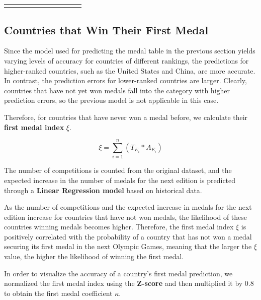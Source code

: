 \documentclass[12pt]{article}  %
\begin{document}
\begin{longtable}{l|c|c|c|c|c|c|c|c|c|c}
	\multicolumn{1}{l}{} & \multicolumn{1}{c}{}                                                   & \multicolumn{1}{c}{}                                                   & \multicolumn{1}{c}{}                                                   & \multicolumn{1}{c}{}                                                   & \multicolumn{1}{c}{}                                                   & \multicolumn{1}{c}{}                                                   & \multicolumn{1}{c}{}      & \multicolumn{1}{c}{}        & \multicolumn{1}{c}{}        &                           
\end{longtable}
\subsection{Countries that Win Their First Medal}
Since the model used for predicting the medal table in the previous section yields varying levels of accuracy for countries of different rankings, the predictions for higher-ranked countries, such as the United States and China, are more accurate. In contrast, the prediction errors for lower-ranked countries are larger. Clearly, countries that have not yet won medals fall into the category with higher prediction errors, so the previous model is not applicable in this case.

Therefore, for countries that have never won a medal before, we calculate their \textbf{first medal index} $\xi$.

\begin{equation}
	\xi = \sum_{i=1}^{n} \left( T_{E_i} \ast A_{E_i} \right)
\end{equation}





The number of competitions is counted from the original dataset, and the expected increase in the number of medals for the next edition is predicted through a \textbf{Linear Regression model} based on historical data.

As the number of competitions and the expected increase in medals for the next edition increase for countries that have not won medals, the likelihood of these countries winning medals becomes higher. Therefore, the first medal index $\xi$ is positively correlated with the probability of a country that has not won a medal securing its first medal in the next Olympic Games, meaning that the larger the $\xi$ value, the higher the likelihood of winning the first medal.

In order to visualize the accuracy of a country's first medal prediction, we normalized the first medal index using the \textbf{Z-score} and then multiplied it by 0.8 to obtain the first medal coefficient $\kappa$.
\end{document}
